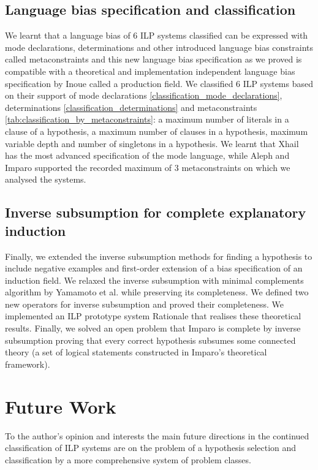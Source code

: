 \subsection{Language bias specification and classification}
We learnt that a language bias of 6 ILP systems classified can be expressed with mode declarations, determinations and other introduced language bias constraints called metaconstraints and this new language bias specification as we proved is compatible with a theoretical and implementation independent language bias specification by Inoue called a production field. We classified 6 ILP systems based on their support of mode declarations \ref{classification_mode_declarations},
determinations \ref{classification_determinations} and metaconstraints \ref{tab:classification_by_metaconstraints}: a maximum number of literals in a clause of a hypothesis, a maximum number of clauses in a hypothesis, maximum variable depth and number of singletons in a hypothesis. We learnt that Xhail has the most advanced specification of the mode language, while Aleph and Imparo supported the recorded maximum of 3 metaconstraints on which we analysed the systems.

\subsection{Inverse subsumption for complete explanatory induction}
Finally, we extended the inverse subsumption methods for finding a hypothesis to include negative examples and first-order extension of a bias specification of an induction field. We relaxed the inverse subsumption with minimal complements algorithm by Yamamoto et al. while preserving its completeness. We defined two new  operators for inverse subsumption and proved their completeness. We implemented an ILP prototype system Rationale that realises these theoretical results. Finally, we solved an open problem that Imparo
is complete by inverse subsumption proving that every correct hypothesis subsumes some connected
theory (a set of logical statements constructed in Imparo's theoretical framework).

\section{Future Work}
To the author's opinion and interests the main future directions in the continued classification of ILP systems are on the problem of a hypothesis selection and classification by a more comprehensive system of problem classes.

